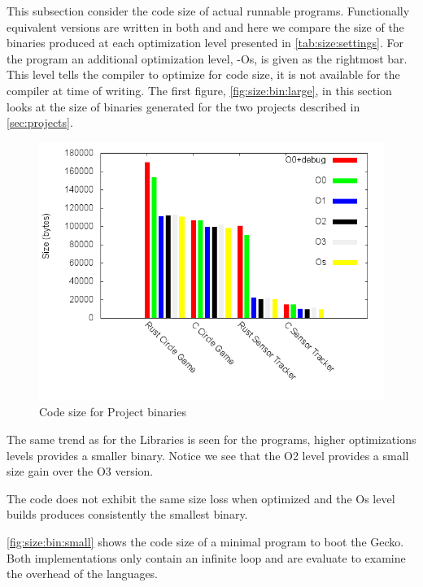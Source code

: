 This subsection consider the code size of actual runnable programs.
Functionally equivalent versions are written in both {\rust} and {\C} and here we compare the size of the binaries produced at each optimization level presented in \autoref{tab:size:settings}.
For the {\C} program an additional optimization level, -Os, is given as the rightmost bar.
This level tells the compiler to optimize for code size, it is not available for the {\rust} compiler at time of writing.
The first figure, \autoref{fig:size:bin:large}, in this section looks at the size of binaries generated for the two projects described in \autoref{sec:projects}.

\begin{figure}[H]
  \begin{center}
    \includegraphics[scale=0.5]{results/plots/size/bin/large/size.png}
  \end{center}
  \caption{Code size for Project binaries}
  \label{fig:size:bin:large}
\end{figure}

The same trend as for the Libraries is seen for the {\rust} programs, higher optimizations levels provides a smaller binary.
Notice we see that the O2 level provides a small size gain over the O3 version.

The {\C} code does not exhibit the same size loss when optimized and the Os level builds produces consistently the smallest binary.

\autoref{fig:size:bin:small} shows the code size of a minimal program to boot the Gecko.
Both implementations only contain an infinite loop and are evaluate to examine the overhead of the languages.


